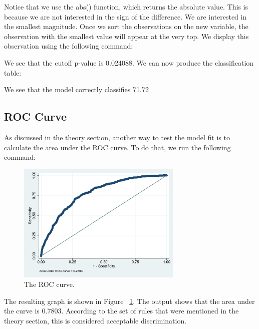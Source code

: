 \documentclass[a4paper,12pt,oneside]{book}
\begin{document}
\begin{stlog}\end{stlog}

Notice that we use the abs() function, which returns the absolute value. This is because we are not interested in the sign of the difference. We are interested in the smallest magnitude. 
Once we sort the observations on the new variable, the observation with the smallest value will appear at the very top. We display this observation using the following command:

\begin{stlog}\end{stlog}

We see that the cutoff p-value is 0.024088. We can now produce the classification table:

\begin{stlog}\end{stlog}

We see that the model correctly classifies 71.72%
\subsection{ROC Curve}
As discussed in the theory section, another way to test the model fit is to calculate the area under the ROC curve. To do that, we run the following command:

\begin{stlog}\end{stlog}
\begin{figure}[h]
    \centering
    \includegraphics[width=0.7\textwidth]{book_41.pdf}
    \caption{The ROC curve.}
    \label{fig:roc}
\end{figure}

The resulting graph is shown in Figure ~\ref{fig:roc}. The output shows that the area under the curve is 0.7803. According to the set of rules that were mentioned in the theory section, this is considered acceptable 
discrimination.
\end{document}
